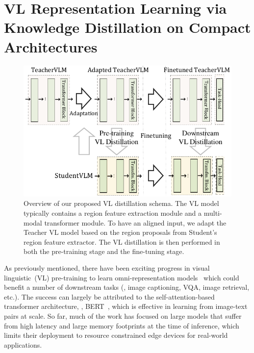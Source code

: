 

\section{VL Representation Learning via Knowledge Distillation on Compact Architectures}



\begin{figure}[h]
    \centering
    \includegraphics[width=.95\textwidth]{images/distillvlm_abstract.pdf} 
    \caption[Overview of our proposed VL distillation schema. ]{ Overview of our proposed VL distillation schema. 
    The VL model typically contains a region feature extraction module and a multi-modal transformer module. To have an aligned input, we adapt the Teacher VL model based on the region proposals from Student's region feature extractor. The VL distillation is then performed in both the pre-training stage and the fine-tuning stage.
    }
    \label{fig:abstract}
\end{figure}


As previously mentioned, there have been exciting progress in visual linguistic~(VL) pre-training to learn omni-representation models~\cite{lu2019vilbert,su2019vl,chen2019uniter,tan2019lxmert,zhou2020unified,li2020oscar} which could benefit a number of downstream tasks (\ie, image captioning, VQA, image retrieval, etc.). The success can largely be attributed to the self-attention-based~\cite{vaswani2017attention} transformer architecture, \eg, BERT~\cite{devlin2018bert}, which is effective in learning from image-text pairs at scale. So far, much of the work has focused on large models that suffer from high latency and large memory footprints at the time of inference, which limits their deployment to resource constrained edge devices for real-world applications. 


